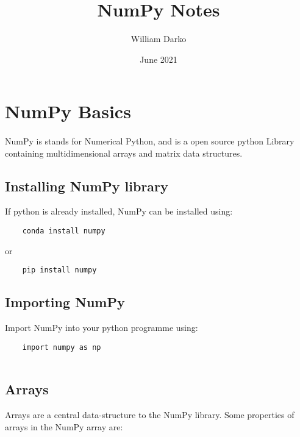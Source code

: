 \documentclass[12pt, a4paper]{article}
\title{NumPy Notes}
\author{William Darko}
\date{June 2021}
\begin{document}
\maketitle
\newpage

\tableofcontents

\newpage

\section{NumPy Basics}
\paragraph*{}
NumPy is stands for Numerical Python, and is a open source python Library containing multidimensional arrays and matrix data structures.

\subsection{Installing NumPy library}

If python is already installed, NumPy can be installed using:
\newline

\begin{lstlisting}
    conda install numpy
\end{lstlisting}

or

\begin{lstlisting}
    pip install numpy
\end{lstlisting}


\subsection{Importing NumPy}

Import NumPy into your python programme using:
\newline

\begin{lstlisting}
    import numpy as np
    
\end{lstlisting}


\subsection{Arrays}
Arrays are a central data-structure to the NumPy library. Some properties of arrays in the NumPy array are:
\end{document}
